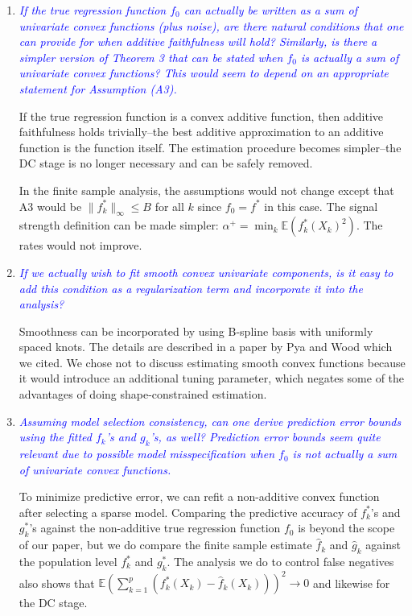 \documentclass[pdftex,12pt]{article}
\let\hat\widehat
\def\rc#1{{\it\textcolor{blue}{#1}}\smallskip}
\begin{document}
\begin{enumerate}[(1)]
\item \rc{If the true regression function $f_0$ can actually be written as a
sum of univariate convex functions (plus noise), are there natural
conditions that one can provide for when additive faithfulness will
hold? Similarly, is there a simpler version of Theorem 3 that can be
stated when $f_0$ is actually a sum of univariate convex functions? This
would seem to depend on an appropriate statement for Assumption (A3).}

If the true regression function is a convex additive function, then additive faithfulness holds trivially--the best additive approximation to an additive function is the function itself. The estimation procedure becomes simpler--the DC stage is no longer necessary and can be safely removed. 

In the finite sample analysis, the assumptions would not change except that A3 would be $\| f^*_k \|_\infty \leq B$ for all $k$ since $f_0 = f^*$ in this case. The signal strength definition can be made simpler: $\alpha^+ = \min_k \mathbb{E}( f^*_k(X_k)^2 )$. The rates would not improve.


\item \rc{If we actually wish to fit smooth convex univariate components, is
it easy to add this condition as a regularization term and incorporate
it into the analysis?}

Smoothness can be incorporated by using B-spline basis with uniformly spaced knots. The details are described in a paper by Pya and Wood which we cited. We chose not to discuss estimating smooth convex functions because it would introduce an additional tuning parameter, which negates some of the advantages of doing shape-constrained estimation.

\item \rc{Assuming model selection consistency, can one derive prediction
error bounds using the fitted $f_k$'s and $g_k$'s, as well? Prediction error
bounds seem quite relevant due to possible model misspecification when
$f_0$ is not actually a sum of univariate convex functions.}

To minimize predictive error, we can refit a non-additive convex function after selecting a sparse model. Comparing the predictive accuracy of $f^*_k$'s and $g^*_k$'s against the non-additive true regression function $f_0$ is beyond the scope of our paper, but we do compare the finite sample estimate $\hat{f}_k$ and $\hat{g}_k$ against the population level $f^*_k$ and $g^*_k$. The analysis we do to control false negatives also shows that $\mathbb{E}\left(\sum_{k=1}^p (f^*_k(X_k) - \hat{f}_k(X_k))\right)^2 \rightarrow 0$ and likewise for the DC stage.


\end{enumerate}
\end{document}
